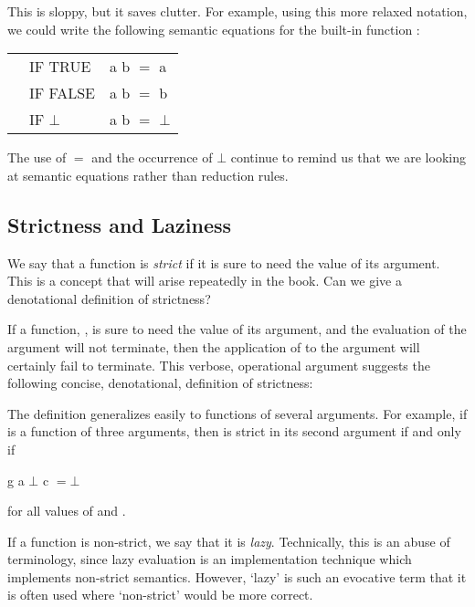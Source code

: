 This is sloppy, but it saves clutter. For example, using this more relaxed
notation, we could write the following semantic equations for the built-in
function :
\begin{mlcoded}
    \setlength{\tabcolsep}{2pt}
    \begin{tabular}{lll}
    &IF TRUE &a b $=$ a \\
    &IF FALSE &a b $=$ b \\
    &IF $\bot$ &a b $=$ $\bot$
    \end{tabular}
\end{mlcoded}
The use of $=$ and the occurrence of $\bot$ continue to remind us that we are looking
at semantic equations rather than reduction rules.

\subsection{Strictness and Laziness}

We say that a function is \textit{strict} if it is sure to need the value of its argument.
This is a concept that will arise repeatedly in the book. Can we give a
denotational definition of strictness?

If a function, , is sure to need the value of its argument, and the evaluation
of the argument will not terminate, then the application of  to the argument
will certainly fail to terminate. This verbose, operational argument suggests
the following concise, denotational, definition of strictness:


The definition generalizes easily to functions of several arguments. For
example, if  is a function of three arguments, then  is strict in its second
argument if and only if
\begin{mlcoded}
    g a $\bot$ c $= \bot$
\end{mlcoded}
for all values of  and .

If a function is non-strict, we say that it is \textit{lazy}. Technically, this is an abuse
of terminology, since lazy evaluation is an implementation technique which
implements non-strict semantics. However, `lazy' is such an evocative term
that it is often used where `non-strict' would be more correct.

